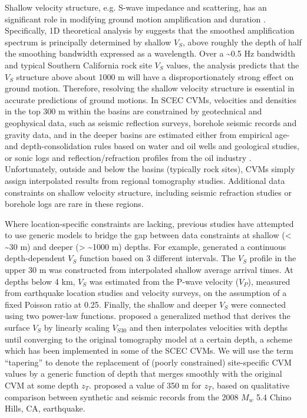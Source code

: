 Shallow velocity structure, e.g. S-wave impedance and scattering, has an significant role in modifying ground motion amplification and duration . Specifically, 1D theoretical analysis by \citet{dayRMSResponseOnedimensional1996} suggests that the smoothed amplification spectrum is principally determined by shallow $V_S$, above roughly the depth of half the smoothing bandwidth expressed as a wavelength. Over a \textasciitilde 0.5 Hz bandwidth and typical Southern California rock site $V_S$ values, the analysis predicts that the $V_S$ structure above about 1000 m will have a disproportionately strong effect on ground motion. Therefore, resolving the shallow velocity structure is essential in accurate predictions of ground motions. In SCEC CVMs, velocities and densities in the top 300 m within the basins are constrained by geotechnical and geophysical data, such as seismic reflection surveys, borehole seismic records and gravity data, and in the deeper basins are estimated either from empirical age- and depth-consolidation rules based on water and oil wells and geological studies, or sonic logs and reflection/refraction profiles from the oil industry \citep{magistraleGeologybased3DVelocity1996,magistraleSCECSouthernCalifornia2000,sussWaveSeismicVelocity2003}. Unfortunately, outside and below the basins (typically rock sites), CVMs simply assign interpolated results from regional tomography studies. Additional data constraints on shallow velocity structure, including seismic refraction studies  or borehole logs  are rare in these regions.

Where location-specific constraints are lacking, previous studies have attempted to use generic models to bridge the gap between data constraints at shallow (< \textasciitilde 30 m) and deeper (> \textasciitilde 1000 m) depths. For example, \citet{booreSiteAmplificationsGeneric1997} generated a continuous depth-dependent $V_S$ function based on 3 different intervals. The $V_S$ profile in the upper 30 m was constructed from interpolated shallow average arrival times. At depths below 4 km, $V_S$ was estimated from the P-wave velocity ($V_P$), measured from earthquake location studies and velocity surveys, on the assumption of a fixed Poisson ratio at 0.25. Finally, the shallow and deeper $V_S$ were connected using two power-law functions. \citet{elyVs30derivedNearsurfaceSeismic2010} proposed a generalized method that derives the surface $V_S$ by linearly scaling $V_{S30}$ and then interpolates velocities with depths until converging to the original tomography model at a certain depth, a scheme which has been implemented in some of the SCEC CVMs. We will use the term ``tapering'' to denote the replacement of (poorly constrained) site-specific CVM values by a generic function of depth that merges smoothly with the original CVM at some depth $z_T$. \citet{elyVs30derivedNearsurfaceSeismic2010} proposed a value of 350 m for $z_T$, based on qualitative comparison between synthetic and seismic records from the 2008 $M_w$ 5.4 Chino Hills, CA, earthquake.

